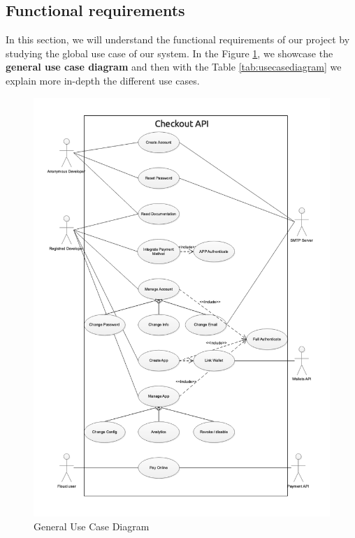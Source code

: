\begin{spacing}{1.2}
\subsection{Functional requirements}
In this section, we will understand the functional requirements of our project by studying the global use case of our system.
	\newline In the Figure \ref{fig:usecasediagram}, we showcase the \textbf{general use case diagram} and then with the Table \ref{tab:usecasediagram} we explain more in-depth the different use cases.
\begin{figure}[H]\centering
\includegraphics[scale=0.6]{GeneralUseCase.png}
\caption{General Use Case Diagram}
\label{fig:usecasediagram}
\end{figure}


\end{spacing}
